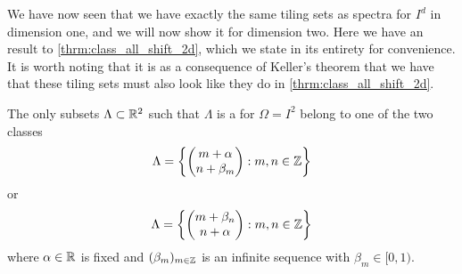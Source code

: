 \documentclass[../thesis.tex]{subfiles}
\begin{document}

We have now seen that we have exactly the same tiling sets as spectra for $I^d$ in dimension one, and we will now show it for dimension two. Here we have an  result to \cref{thrm:class_all_shift_2d}, which we state in its entirety for convenience. It is worth noting that it is as a consequence of Keller's theorem that we have that these tiling sets must also look like they do in \cref{thrm:class_all_shift_2d}.

\begin{theorem}\label{thrm:class_all_tiling_2d}
    The only subsets $\Lambda \subset \mathbb{R}^2$ such that $\Lambda$ is a  for $\Omega = I^2$ belong to one of the two classes
    \begin{equation}\label{eq:2d_all_shift_class_1_tiling}
        \Lambda = \left\{
            \begin{pmatrix}
            m + \alpha \\
            n + \beta_m
            \end{pmatrix} : m,n \in  \mathbb{Z}
            \right\}
    \end{equation}
    or
    \begin{equation}\label{eq:2d_all_shift_class_2_tiling}
        \Lambda = \left\{
            \begin{pmatrix}
            m + \beta_n\\
            n + \alpha
            \end{pmatrix} : m,n \in  \mathbb{Z}
            \right\}
    \end{equation}
    where $\alpha \in \mathbb{R}$ is fixed and $(\beta_m)_{m\in \mathbb{Z}}$ is an infinite sequence with $\beta_m \in [0,1)$.
    
\end{theorem}
\end{document}

